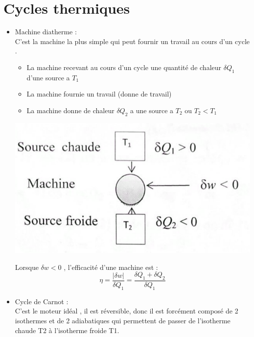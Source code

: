 \documentclass[12pt,oneside]{book}
\begin{document}
\section{Cycles thermiques}
\begin{itemize}
    \item Machine diatherme :\\
          C'est la machine la plus simple qui peut fournir un travail au cours d'un cycle .\\
          \begin{minipage}{0.5\linewidth}
              \begin{itemize}
                  \item La machine recevant au cours d'un cycle une quantité de chaleur $\delta Q_1$ d'une source a $T_1$
                  \item La machine fournie un travail (donne de travail)
                  \item La machine donne de chaleur $\delta Q_2$ a une source a $T_2 \text{ ou } T_2<T_1$
              \end{itemize}
          \end{minipage}
          \begin{minipage}{0.5\linewidth}
              \includegraphics[width=\linewidth]{../pic/3300/3}
          \end{minipage}
          Lorsque $\delta w<0$ , l’efficacité d'une machine est :
          \[\boxed{ \eta = \frac{|\delta w|}{\delta Q_1}  = \frac{\delta Q_1 + \delta Q_2}{\delta Q_1} } \]
    \item Cycle de Carnot : \\
          C'est le moteur idéal , il est réversible, donc il est forcément composé de 2 isothermes et de 2 adiabatiques qui permettent de passer de l'isotherme chaude T2 à l'isotherme froide T1.\\

\end{itemize}
\end{document}
